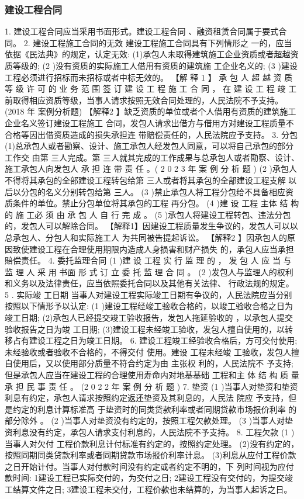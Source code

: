\documentclass[UTF8,12pt]{ctexart}
\numberwithin{equation}{section} %
\numberwithin{figure}{section}
\numberwithin{table}{section}
\begin{document}
	\subsubsection{建设工程合同}
	1. 建设工程合同应当采用书面形式。建设工程合同 、融资租赁合同属于要式合同。
	2. 建设工程施工合同的无效
	建设工程施工合同具有下列情形之 一的，应当依据《民法典》的规定，认定无效: (1)承包人未取得建筑施工企业资质或者超越资质等级的;
	(2 )没有资质的实际施工人借用有资质的建筑施 工企业名义的;
	(3 )建设工程必须进行招标而未招标或者中标无效的。
	【解 释 1 】 承 包 人 超 越 资 质 等 级 许 可 的 业 务 范 围 签 订 建 设 工 程 施 工 合 同 ， 在 建 设 工 程 竣 工前取得相应资质等级，当事人请求按照无效合同处理的，人民法院不予支持。(2018 年 案例分析题)
	【解释2 】缺乏资质的单位或者个人借用有资质的建筑施工企业名义签订建设工程施工 合同，发包人请求出借方与借用方对建设工程质量不合格等因出借资质造成的损失承担连 带赔偿责任的，人民法院应予支持。
	3. 分包 (1)总承包人或者勘察、设计、施工承包人经发包人同意，可以将自己承包的部分工作交 由第 三人完成。第 三人就其完成的工作成果与总承包人或者勘察、设计、施工承包人向发包人 承 担 连 带 责 任 。( 2 0 2 3 年 案 例 分 析 题 )
	(2 )承包人不得将其承包的全部建设工程转包给第 三人或者将其承包的全部建设工程支解 以后以分包的名义分别转包给第 三人。
	(3 )禁止承包人将工程分包给不具备相应资质条件的单位。禁止分包单位将其承包的工程 再分包。
	(4 )建 设 工程 主体 结 构 的 施 工必 须 由 承 包 人 自 行 完 成 。
	(5 )承包人将建设工程转包、违法分包的，发包人可以解除合同。
	【解释1】因建设工程质量发生争议的，发包人可以以总承包人、分包人和实际施工人 为共同被告提起诉讼。
	【解释2 】因承包人的原因致使建设工程在合理使用期限内造成人身损害和财产损失 的，承包人应当承担賠偿责任。
	4. 委托监理合同
	(1 )建 设 工程 实 行 监 理 的 ， 发 包 人 应 当 与 监 理 人 采 用 书面 形 式 订 立 委 托 监 理 合 同 。
	(2 )发包人与监理人的权利和义务以及法律责任，应当依照委托合同以及其他有关法律、 行政法规的规定。
	5 . 实际竣 工日期 当事人对建设工程实际竣工日期有争议的，人民法院应当分别按照以下情形予以认定:
	(1 )建设工程经竣工验收合格的，以竣工验收合格之日为竣工日期; (2)承包人已经提交竣工验收报告，发包人拖延验收的 ，以承包人提交验收报告之日为竣 工日期; (3)建设工程未经竣工验收，发包人擅自使用的，以转移占有建设工程之日为竣工日期。
	6. 建设工程竣工经验收合格后，方可交付使用;未经验收或者验收不合格的，不得交付 使用。建设 工程未经竣 工验收，发包人擅自使用后，又以使用部分质量不符合约定为由 主张权 利的，人民法院不 予支持;但是承包人应当在建设工程的合理使用寿命内对地基基础 工程和主 体 结 构 质 量 承 担 民 事 责 任 。 (2 0 2 2 年 案 例 分 析 题 )
	7. 垫资
	(1 )当事人对垫资和垫资利息有约定，承包人请求按照约定返还垫资及其利息的，人民法 院应 予支持，但是约定的利息计算标准高 于垫资时的同类贷款利率或者同期贷款市场报价利率 的部分除外 。
	(2 )当事人对垫资没有约定的，按照工程欠款处理。
	(3 )当事人对垫资利息没有约定，承包人请求支付利息的，人民法院不予支持。
	8. 工程欠款
	(1 )当事人对欠付 工程价款利息计付标准有约定的，按照约定处理。 (2)没有约定的，按照同期同类贷款利率或者同期贷款市场报价利率计息。 (3)利息从应付工程价款之日开始计付。当事人对付款时间没有约定或者约定不明的，下 列时间视为应付款时间:
	1建设工程已实际交付的，为交付之日; 2建设工程没有交付的，为提交竣工结算文件之日; 3建设工程未交付，工程价款也未结算的，为当事人起诉之日。
	
\end{document}
